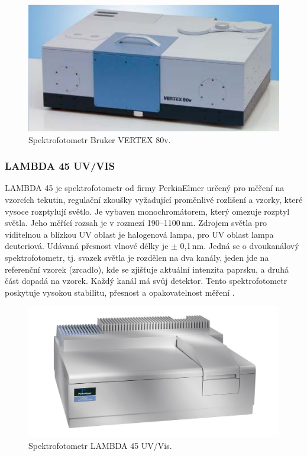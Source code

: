 \documentclass[12pt,oneside,final]{fithesis2}
\begin{document}
\begin{figure}
  \centering
  \includegraphics[width=120mm]{vertex80v.png}
  \caption{Spektrofotometr Bruker VERTEX 80v.}
  \label{verteximg}
\end{figure}

\subsubsection{LAMBDA 45 UV/VIS}
LAMBDA 45 je spektrofotometr od firmy PerkinElmer určený pro měření na vzorcích tekutin, regulační zkoušky vyžadující proměnlivé rozlišení a vzorky, které vysoce rozptylují světlo. Je vybaven monochromátorem, který omezuje rozptyl světla. Jeho měřící rozsah je v rozmezí 190--1100\,nm. Zdrojem světla pro viditelnou a blízkou UV oblast je halogenová lampa, pro UV oblast lampa deuteriová. Udávaná přesnost vlnové délky je $\pm$ 0,1\,nm. Jedná se o dvoukanálový spektrofotometr, tj. svazek světla je rozdělen na dva kanály, jeden jde na referenční vzorek (zrcadlo), kde se zjišťuje aktuální intenzita paprsku, a druhá část dopadá na vzorek. Každý kanál má svůj detektor. Tento spektrofotometr poskytuje vysokou stabilitu, přesnost a opakovatelnost měření \cite{lambda}.

\begin{figure}
  \centering
  \includegraphics[width=120mm]{LAMBDA.jpg}
  \caption{Spektrofotometr LAMBDA 45 UV/Vis.}
  \label{lambdaimg}
\end{figure}
\end{document}
